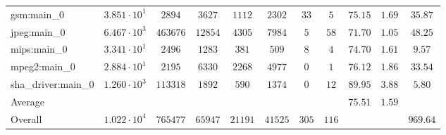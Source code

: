 \begin{tabular}{|l|c|c|c|c|c|c|c|c|c|c|}
gsm:main\_0             & $ 3.851 \cdot 10^{1} $ & $ 2894   $ & $ 3627  $ & $ 1112  $ & $ 2302  $ & $ 33  $ & $ 5   $ & $ 75.15       $ & $ 1.69    $ & $ 35.87   $ \\
jpeg:main\_0            & $ 6.467 \cdot 10^{3} $ & $ 463676 $ & $ 12854 $ & $ 4305  $ & $ 7984  $ & $ 5   $ & $ 58  $ & $ 71.70       $ & $ 1.05    $ & $ 48.25   $ \\
mips:main\_0            & $ 3.341 \cdot 10^{1} $ & $ 2496   $ & $ 1283  $ & $ 381   $ & $ 509   $ & $ 8   $ & $ 4   $ & $ 74.70       $ & $ 1.61    $ & $ 9.57    $ \\
mpeg2:main\_0           & $ 2.884 \cdot 10^{1} $ & $ 2195   $ & $ 6330  $ & $ 2268  $ & $ 4977  $ & $ 0   $ & $ 1   $ & $ 76.12       $ & $ 1.86    $ & $ 33.54   $ \\
sha\_driver:main\_0     & $ 1.260 \cdot 10^{3} $ & $ 113318 $ & $ 1892  $ & $ 590   $ & $ 1374  $ & $ 0   $ & $ 12  $ & $ 89.95       $ & $ 3.88    $ & $ 5.80    $ \\
\hline
Average                 & $                    $ & $        $ & $       $ & $       $ & $       $ & $     $ & $     $ & $ 75.51       $ & $ 1.59    $ & $         $ \\
\hline
Overall                 & $ 1.022 \cdot 10^{4} $ & $ 765477 $ & $ 65947 $ & $ 21191 $ & $ 41525 $ & $ 305 $ & $ 116 $ & $             $ & $         $ & $ 969.64  $ \\
\hline
\end{tabular}
